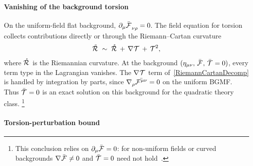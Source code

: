 \paragraph*{Vanishing of the background torsion}

On the uniform-field flat background,
$\partial_\mu\bar{\FieldF{}}_{\nu\rho}=0$.
The field equation for torsion collects contributions
directly or through the Riemann--Cartan curvature
\begin{align}
  \MAGFt{} \;\sim\; \rR{} \,+\, \rcD{}\MAGT{} \,+\, \MAGT{^2} ,
  \label{RiemannCartanDecomp}
\end{align}
where $\rR{}$ is the Riemannian curvature.
At the background $(\eta_{\mu\nu},\,\bar{\FieldF{}},\,\bar{\MAGT{}}=0)$,
every term type in the Lagrangian vanishes.
The $\rcD{}\MAGT{}$ term of~\cref{RiemannCartanDecomp} is handled by integration by parts,
since $\rcD{_\rho}\bar{\FieldF{^{\mu\nu}}}=0$ on the uniform BGMF.
Thus $\bar{\MAGT{}}=0$ is an exact solution on this background
for the quadratic theory class.%
\footnote{This conclusion relies on $\partial_\mu\bar{\FieldF{}}=0$:
for non-uniform fields or curved backgrounds
$\rcD{}\bar{\FieldF{}}\neq 0$ and $\bar{\MAGT{}}=0$ need not
hold~\cite{bahamonde2025torsion}.}

\paragraph*{Torsion-perturbation bound}

